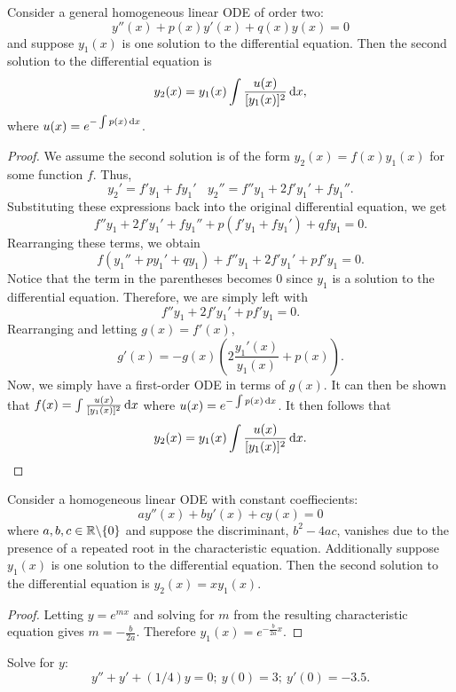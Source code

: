 \begin{theorem}
    Consider a general homogeneous linear ODE of order two:
    $$y''(x)+p(x)y'(x)+q(x)y(x)=0$$
    and suppose $y_1(x)$ is one solution to the differential equation. Then
    the second solution to the differential equation is
    $$y_2(x) = y_1(x)\int \frac{u(x)}{[y_1(x)]^2} \dif x,$$
    where $u(x) = e^{-\int p(x) \dif x}$.
\end{theorem}
\begin{proof}
    We assume the second solution is of the form $y_2(x) = f(x)y_1(x)$ for
    some function $f$. Thus,
    $$y_2' = f'y_1+fy_1'~~~~y_2'' = f''y_1+2f'y_1'+fy_1''.$$
    Substituting these expressions back into the original differential
    equation, we get
    $$f''y_1+2f'y_1'+fy_1''+p(f'y_1+fy_1')+qfy_1 = 0.$$ Rearranging these
    terms, we obtain $$f(y_1''+py_1'+qy_1)+f''y_1+2f'y_1'+pf'y_1 = 0.$$ Notice
    that the term in the parentheses becomes $0$ since $y_1$ is a solution
    to the differential equation. Therefore, we are simply left with
    $$f''y_1+2f'y_1'+pf'y_1 = 0.$$ Rearranging and letting $g(x) = f'(x)$,
    $$g'(x) = -g(x)\left(2\frac{y_1'(x)}{y_1(x)}+p(x)\right).$$ Now, we simply
    have a first-order ODE in terms of $g(x)$. It can then be shown that
    $f(x) = \int \frac{u(x)}{[y_1(x)]^2} \dif x$ where 
    $u(x) = e^{-\int p(x) \dif x}$. It then follows that
    $$y_2(x) = y_1(x)\int \frac{u(x)}{[y_1(x)]^2} \dif x.$$
\end{proof}
\begin{corollary}
    Consider a homogeneous linear ODE with constant coeffiecients:
    $$ay''(x)+by'(x)+cy(x) = 0$$ where $a,b,c \in \mathbb R \text{\textbackslash} \{0\}$ and suppose the 
    discriminant, $b^2-4ac$, vanishes due to the presence of a repeated
    root in the characteristic equation. Additionally suppose $y_1(x)$ is 
    one solution to the differential equation. Then the second solution to the
    differential equation is $y_2(x) = xy_1(x)$.
\end{corollary}
\begin{proof}
    Letting $y=e^{mx}$ and solving for $m$ from the resulting characteristic
    equation gives $m = -\frac{b}{2a}$. Therefore $y_1(x) = e^{-\frac{b}{2a}x}$.
\end{proof}
\begin{example}
    Solve for $y$: $$y''+y'+(1/4)y=0;~y(0) = 3; ~ y'(0) = -3.5.$$
\end{example}
